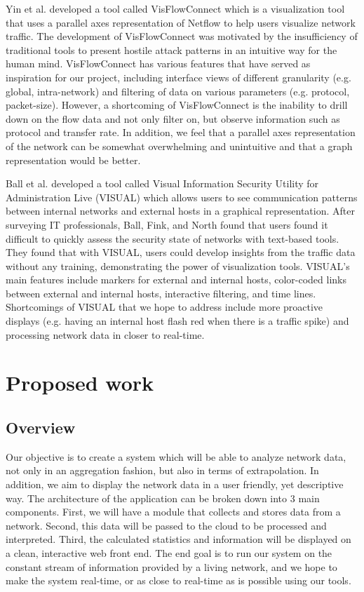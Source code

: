 \documentclass{sig-alternate}
\begin{document}
Yin et al.\cite{Yin04} developed a tool called VisFlowConnect which is a
visualization tool that uses a parallel axes representation of Netflow to help
users visualize network traffic. The development of VisFlowConnect was motivated
by the insufficiency of traditional tools to present hostile attack patterns in
an intuitive way for the human mind. VisFlowConnect has various features that
have served as inspiration for our project, including interface views of
different granularity (e.g. global, intra-network) and filtering of data on
various parameters (e.g. protocol, packet-size). However, a shortcoming of
VisFlowConnect is the inability to drill down on the flow data and not only
filter on, but observe information such as protocol and transfer rate. In
addition, we feel that a parallel axes representation of the network can be
somewhat overwhelming and unintuitive and that a graph representation would be
better.

Ball et al.\cite{Ball04} developed a tool called Visual Information Security
Utility for Administration Live (VISUAL) which allows users to see communication
patterns between internal networks and external hosts in a graphical
representation. After surveying IT professionals, Ball, Fink, and North found
that users found it difficult to quickly assess the security state of networks
with text-based tools. They found that with VISUAL, users could develop insights
from the traffic data without any training, demonstrating the power of
visualization tools. VISUAL’s main features include markers for external and
internal hosts, color-coded links between external and internal hosts,
interactive filtering, and time lines. Shortcomings of VISUAL that we hope to
address include more proactive displays (e.g. having an internal host flash red
when there is a traffic spike) and processing network data in closer to
real-time.

\section{Proposed work}

\subsection{Overview}

Our objective is to create a system which will be able to analyze network data,
not only in an aggregation fashion, but also in terms of extrapolation. In
addition, we aim to display the network data in a user friendly, yet descriptive
way. The architecture of the application can be broken down into 3 main
components. First, we will have a module that collects and stores data from a
network. Second, this data will be passed to the cloud to be processed and
interpreted. Third, the calculated statistics and information will be displayed
on a clean, interactive web front end. The end goal is to run our system on the
constant stream of information provided by a living network, and we hope to make
the system real-time, or as close to real-time as is possible using our tools.
\end{document}
